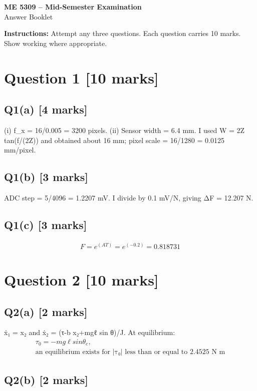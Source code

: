 \documentclass[11pt,a4paper]{article}
\begin{document}
\begin{center}
{\Large\bfseries ME 5309 -- Mid-Semester Examination}\\[3pt]
{\large Answer Booklet}\\[8pt]
\end{center}
\textbf{Instructions:} Attempt any three questions. Each question carries 10 marks. Show working where appropriate.
\section*{Question 1 \hfill [10 marks]}
\subsection*{Q1(a) \hfill [4 marks]}

(i) f\_x = 16/0.005 = 3200 pixels.
(ii) Sensor width = 6.4 mm.
I used W = 2Z tan(f/(2Z)) and obtained about 16 mm; pixel scale = 16/1280 = 0.0125 mm/pixel.

\subsection*{Q1(b) \hfill [3 marks]}

ADC step = 5/4096 = 1.2207 mV.
I divide by 0.1 mV/N, giving ΔF = 12.207 N.

\subsection*{Q1(c) \hfill [3 marks]}

\[\begin{aligned}F = e^(AT) = e^(-0.2) = 0.818731\end{aligned}\]

\section*{Question 2 \hfill [10 marks]}
\subsection*{Q2(a) \hfill [2 marks]}

ẋ₁ = x₂ and ẋ₂ = (τ-b x₂+mgℓ sin θ)/J.
At equilibrium:\[\begin{aligned}τ_0 = -mg\ell sin \theta_e,\\ \text{an equilibrium exists for |τ₀| less than or equal to 2.4525 N m}\end{aligned}\]

\subsection*{Q2(b) \hfill [2 marks]}
\end{document}
